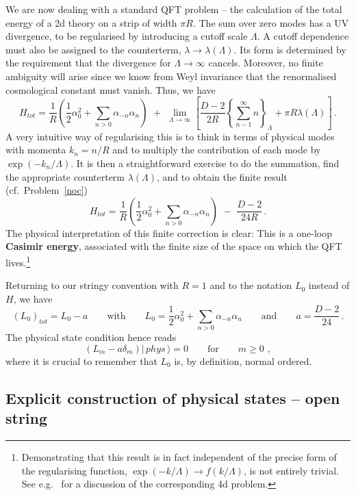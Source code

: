 \documentclass[12pt]{article}
\newcommand{\be}{\begin{equation}}
\newcommand{\ee}{\end{equation}}
\numberwithin{equation}{section}
\begin{document}
We are now dealing with a standard QFT problem -- the calculation of the total energy of a 2d theory on a strip of width $\pi R$. The sum over zero modes has a UV divergence, to be regularised by introducing a cutoff scale $\Lambda$. A cutoff dependence must also be assigned to the counterterm, $\lambda\to \lambda(\Lambda)$. Its form is determined by the requirement that the divergence for $\Lambda\to \infty$ cancels. Moreover, no finite ambiguity will arise since we know from Weyl invariance that the renormalised cosmological constant must vanish. Thus, we have
\be
H_{tot}=\frac{1}{R}\left( \frac{1}{2}\alpha_0^2+\sum_{n>0}\alpha_{-n}\alpha_n  \right)\,\,+\,\,\lim_{\Lambda\to\infty}\left[ \frac{D-2}{2R}\left\{\sum_{n-1}^\infty n \right\}_\Lambda +\pi R\lambda(\Lambda) \right]\,.
\ee
A very intuitive way of regularising this is to think in terms of physical modes with momenta $k_n=n/R$ and to multiply the contribution of each mode by $\exp(-k_n/\Lambda)$. It is then a straightforward exercise to do the summation, find the appropriate counterterm $\lambda(\Lambda)$, and to obtain the finite result
(cf.~Problem~\ref{noc})
\be
H_{tot}=\frac{1}{R}\left( \frac{1}{2}\alpha_0^2+\sum_{n>0}\alpha_{-n}\alpha_n  \right)\,\,-\,\,\frac{D-2}{24R}\,.
\ee
The physical interpretation of this finite correction is clear: This is a one-loop {\bf Casimir energy}, associated with the finite size of the space on which the QFT lives.\footnote{
Demonstrating 
that this result is in fact independent of the precise form of the regularising function, $\exp(-k/\Lambda)\to f(k/\Lambda)$, is not entirely trivial. See e.g.~\cite{Itzykson:1980rh} for a discussion of the corresponding 4d problem.
}

Returning to our stringy convention with $R=1$ and to the notation $L_0$ instead of $H$, we have
\be
(L_0)_{tot}=L_0-a\qquad \mbox{with}\qquad L_0=\frac{1}{2}\alpha_0^2+\sum_{n>0}\alpha_{-n}\alpha_n \qquad\mbox{and}\qquad
a=\frac{D-2}{24}\,.
\ee
The physical state condition hence reads 
\be
(L_m-a\delta_m)|\,phys\,\rangle=0\qquad\mbox{for}\qquad m\ge 0\,\,,
\ee
where it is crucial to remember that $L_0$ is, by definition, normal ordered. 






\subsection{Explicit construction of physical states -- open string}
\end{document}
